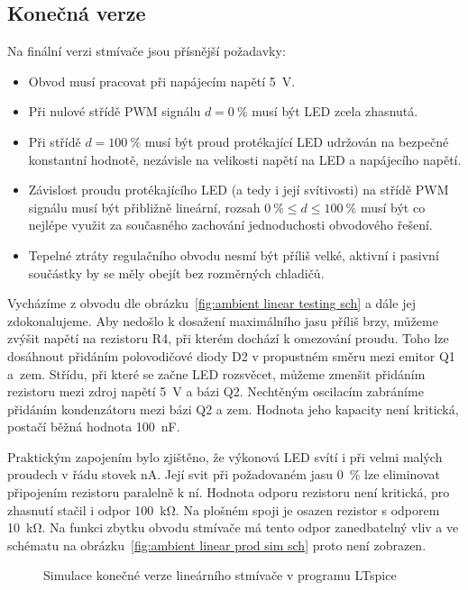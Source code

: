 \subsection{Konečná verze}
Na finální verzi stmívače jsou přísnější požadavky:
\begin{itemize}[nosep]
    \item Obvod musí pracovat při napájecím napětí \SI{5}{\volt}.
    \item Při nulové střídě PWM signálu $d = \SI{0}{\percent}$ musí být LED
        zcela zhasnutá.
    \item Při střídě $d = \SI{100}{\percent}$ musí být proud protékající LED
        udržován na bezpečné konstantní hodnotě, nezávisle na velikosti
        napětí na LED a napájecího napětí.
    \item Závislost proudu protékajícího LED (a tedy i její svítivosti) na
        střídě PWM signálu musí být přibližně lineární, rozsah
        $\SI{0}{\percent} \le d \le \SI{100}{\percent}$ musí být co nejlépe
        využit za současného zachování jednoduchosti obvodového řešení.
    \item Tepelné ztráty regulačního obvodu nesmí být příliš velké, aktivní
        i pasivní součástky by se měly obejít bez rozměrných chladičů.
\end{itemize}

Vycházíme z obvodu dle obrázku~\vref{fig:ambient linear testing sch} a dále jej
zdokonalujeme. Aby nedošlo k dosažení maximálního jasu příliš brzy, můžeme
zvýšit napětí na rezistoru R4, při kterém dochází k omezování proudu. Toho lze
dosáhnout přidáním polovodičové diody D2 v propustném směru mezi emitor Q1
a~zem. Střídu, při které se začne LED rozsvěcet, můžeme zmenšit přidáním
rezistoru mezi zdroj napětí \SI{5}{\volt} a bázi Q2. Nechtěným oscilacím
zabráníme přidáním kondenzátoru mezi bázi Q2 a zem. Hodnota jeho kapacity není
kritická, postačí běžná hodnota \SI{100}{\nano\farad}.

Praktickým zapojením bylo zjištěno, že výkonová LED svítí i při velmi malých
proudech v řádu stovek \si{\nano\ampere}. Její svit při požadovaném jasu
\SI{0}{\percent} lze eliminovat připojením rezistoru paralelně k ní. Hodnota
odporu rezistoru není kritická, pro zhasnutí stačil i odpor
\SI{100}{\kilo\ohm}. Na plošném spoji je osazen rezistor s odporem
\SI{10}{\kilo\ohm}. Na funkci zbytku obvodu stmívače má tento odpor
zanedbatelný vliv a ve schématu na
obrázku~\vref{fig:ambient linear prod sim sch} proto není zobrazen.

\begin{figure}
    \centering
    \caption{Simulace konečné verze lineárního stmívače v programu LTspice}
    \label{fig:ambient linear prod sim}
\end{figure}

